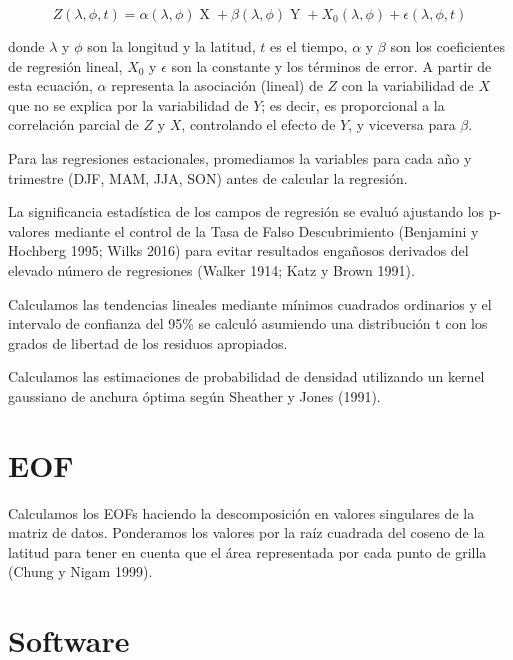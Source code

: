 \documentclass[12pt,oneside,a4paper]{reedthesis}
\begin{document}
\begin{equation}
Z(\lambda, \phi, t) = \alpha(\lambda, \phi) \operatorname{X} + \beta(\lambda, \phi) \operatorname{Y} + X_0(\lambda, \phi) + \epsilon(\lambda, \phi, t)
\label{eq:multiple-regression-sam}
\end{equation}

donde \(\lambda\) y \(\phi\) son la longitud y la latitud, \(t\) es el tiempo, \(\alpha\) y \(\beta\) son los coeficientes de regresión lineal, \(X_0\) y \(\epsilon\) son la constante y los términos de error.
A partir de esta ecuación, \(\alpha\) representa la asociación (lineal) de \(Z\) con la variabilidad de \(X\) que no se explica por la variabilidad de \(Y\); es decir, es proporcional a la correlación parcial de \(Z\) y \(X\), controlando el efecto de \(Y\), y viceversa para \(\beta\).

Para las regresiones estacionales, promediamos la variables para cada año y trimestre (DJF, MAM, JJA, SON) antes de calcular la regresión.

La significancia estadística de los campos de regresión se evaluó ajustando los p-valores mediante el control de la Tasa de Falso Descubrimiento (Benjamini y Hochberg 1995; Wilks 2016) para evitar resultados engañosos derivados del elevado número de regresiones (Walker 1914; Katz y Brown 1991).

Calculamos las tendencias lineales mediante mínimos cuadrados ordinarios y el intervalo de confianza del 95\% se calculó asumiendo una distribución t con los grados de libertad de los residuos apropiados.

Calculamos las estimaciones de probabilidad de densidad utilizando un kernel gaussiano de anchura óptima según Sheather y Jones (1991).

\hypertarget{eof}{%
\section{EOF}\label{eof}}

Calculamos los EOFs haciendo la descomposición en valores singulares de la matriz de datos.
Ponderamos los valores por la raíz cuadrada del coseno de la latitud para tener en cuenta que el área representada por cada punto de grilla (Chung y Nigam 1999).

\hypertarget{software}{%
\section{Software}\label{software}}
\end{document}
